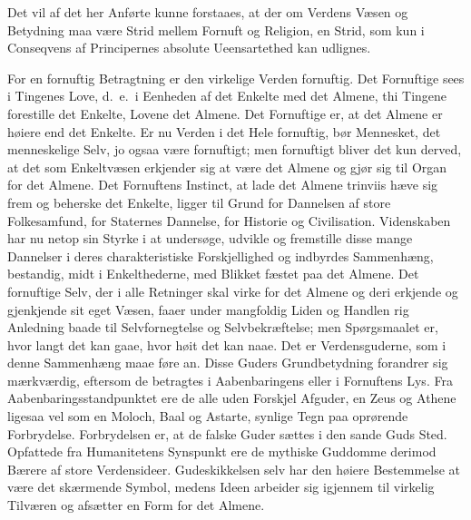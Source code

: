 \documentclass[12pt]{book}
\begin{document}
Det vil af det her Anførte kunne forstaaes, at der om Verdens Væsen
og Betydning maa være Strid mellem Fornuft og Religion, en Strid,
som kun i Conseqvens af Principernes absolute Ueensartethed kan
udlignes.

For en fornuftig Betragtning er den virkelige Verden fornuftig. Det
Fornuftige sees i Tingenes Love, d.\ e.\ i Eenheden af det Enkelte
med det Almene, thi Tingene forestille det Enkelte, Lovene det
Almene. Det Fornuftige
er, at det Almene er høiere end det Enkelte. Er nu Verden i det Hele
fornuftig, bør Mennesket, det menneskelige Selv, jo ogsaa være
fornuftigt; men fornuftigt bliver det kun derved, at det som
Enkeltvæsen erkjender sig at være det Almene og gjør sig til Organ
for det Almene. Det Fornuftens Instinct, at lade det Almene trinviis
hæve sig frem og beherske det Enkelte, ligger til Grund for
Dannelsen af store Folkesamfund, for Staternes Dannelse, for
Historie og Civilisation. Videnskaben har nu netop sin Styrke i at
undersøge, udvikle og fremstille disse mange Dannelser i deres
charakteristiske Forskjellighed og indbyrdes Sammenhæng, bestandig,
midt i Enkelthederne, med Blikket fæstet paa det Almene. Det
fornuftige Selv, der i alle Retninger skal virke for det Almene og
deri erkjende og gjenkjende sit eget Væsen, faaer under mangfoldig
Liden og Handlen rig Anledning baade til Selvfornegtelse og
Selvbekræftelse; men Spørgsmaalet er, hvor langt det kan gaae, hvor
høit det kan naae. Det er Verdensguderne, som i denne Sammenhæng
maae føre an. Disse Guders Grundbetydning forandrer sig
mærkværdig, eftersom de betragtes i Aabenbaringens eller i
Fornuftens Lys. Fra Aabenbaringsstandpunktet ere de alle uden
Forskjel Afguder, en Zeus og Athene ligesaa vel som en Moloch, Baal
og Astarte, synlige Tegn paa oprørende Forbrydelse. Forbrydelsen er,
at de falske Guder sættes i den sande Guds Sted. Opfattede fra
Humanitetens Synspunkt ere de mythiske Guddomme derimod Bærere af
store Verdensideer. Gudeskikkelsen selv har den høiere Bestemmelse
at være det skærmende Symbol, medens Ideen arbeider sig igjennem til
virkelig Tilværen og afsætter en Form for det Almene.
\end{document}
